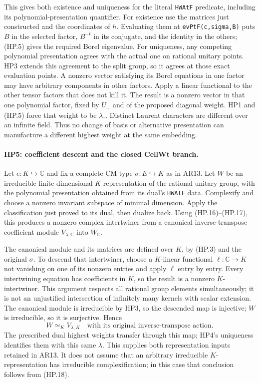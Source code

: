 This gives both existence and uniqueness for the literal
\texttt{HWAtF} predicate, including its polynomial-presentation
quantifier.  For existence use the matrices just constructed and the
coordinates of $h$.  Evaluating them at \texttt{evPtF(c,sigma,B)}
puts $B$ in the selected factor, $B^{-t}$ in its conjugate, and the
identity in the others; (HP.5) gives the required Borel eigenvalue.
For uniqueness, any competing polynomial presentation agrees with
the actual one on rational unitary points.  HP3 extends this agreement
to the split group, so it agrees at those exact evaluation points.
A nonzero vector satisfying its Borel equations in one factor may
have arbitrary components in other factors.  Apply a linear functional
to the other tensor factors that does not kill it.  The result is a
nonzero vector in that one polynomial factor, fixed by $U_+$ and of
the proposed diagonal weight.  HP1 and (HP.5) force that weight to be
$\lambda_\tau$.  Distinct Laurent characters are different over an
infinite field.  Thus no change of basis or alternative presentation
can manufacture a different highest weight at the same embedding.

\paragraph{HP5: coefficient descent and the closed CellWt branch.}
\label{claim:HP5}
Let $e:K\hookrightarrow\mathbb C$ and fix a complete CM type
$\sigma:E\hookrightarrow K$ as in AR13.  Let $W$ be an irreducible
finite-dimensional $K$-representation of the rational unitary group,
with the polynomial presentation obtained from its dual's
\texttt{HWAtF} data.  Complexify and choose a nonzero invariant subspace
of minimal dimension.  Apply the classification just proved to its
dual, then dualize back.  Using (HP.16)--(HP.17), this produces
a nonzero complex intertwiner
from a canonical inverse-transpose coefficient module
$V_{\lambda,\mathbb C}$ into $W_\mathbb C$.

The canonical module and its matrices are defined over $K$, by
(HP.3) and the original $\sigma$.  To descend that intertwiner,
choose a $K$-linear functional $\ell:\mathbb C\to K$ not vanishing
on one of its nonzero entries and apply $\ell$ entry by entry.
Every intertwining equation has coefficients in $K$, so the result
is a nonzero $K$-intertwiner.  This argument respects all rational
group elements simultaneously; it is not an unjustified intersection
of infinitely many kernels with scalar extension.
The canonical module is irreducible by HP3, so the descended map
is injective; $W$ is irreducible, so it is surjective.  Hence
\[
       W\simeq_K V_{\lambda,K}
       \quad\text{with its original inverse-transpose action}.
 \tag{HP.18}
\]
The prescribed dual highest weights transfer through this map;
HP4's uniqueness identifies them with this same $\lambda$.
This supplies both representation inputs retained in AR13.
It does not assume that an arbitrary irreducible $K$-representation
has irreducible complexification; in this case that conclusion
follows from (HP.18).

